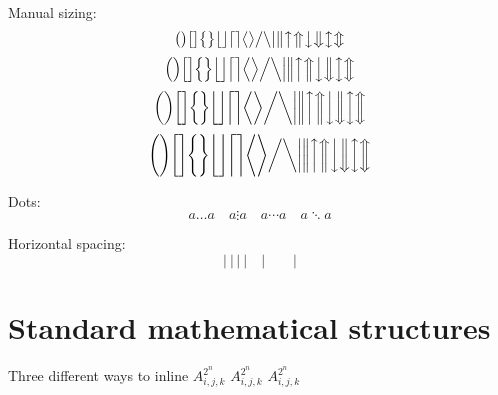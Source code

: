 Manual sizing:
\begin{dmath}[compact,spread={1.250000\baselineskip}] \big( \big) \big[ \big] \big\{ \big\} \big\lfloor \big\rfloor \big\lceil \big\rceil \big\langle \big\rangle  \big/ \big\backslash \big| \big\| \big\uparrow \big\Uparrow \big\downarrow \big\Downarrow \big\updownarrow \big\Updownarrow \end{dmath}
\begin{dmath}[compact,spread={1.250000\baselineskip}] \Big( \Big) \Big[ \Big] \Big\{ \Big\} \Big\lfloor \Big\rfloor \Big\lceil \Big\rceil \Big\langle \Big\rangle  \Big/ \Big\backslash \Big| \Big\| \Big\uparrow \Big\Uparrow \Big\downarrow \Big\Downarrow \Big\updownarrow \Big\Updownarrow \end{dmath}
\begin{dmath}[compact,spread={1.250000\baselineskip}] \bigg( \bigg) \bigg[ \bigg] \bigg\{ \bigg\} \bigg\lfloor \bigg\rfloor \bigg\lceil \bigg\rceil \bigg\langle \bigg\rangle  \bigg/ \bigg\backslash \bigg| \bigg\| \bigg\uparrow \bigg\Uparrow \bigg\downarrow \bigg\Downarrow \bigg\updownarrow \bigg\Updownarrow \end{dmath}
\begin{dmath}[compact,spread={1.250000\baselineskip}] \Bigg( \Bigg) \Bigg[ \Bigg] \Bigg\{ \Bigg\} \Bigg\lfloor \Bigg\rfloor \Bigg\lceil \Bigg\rceil \Bigg\langle \Bigg\rangle  \bigg/ \bigg\backslash \bigg| \bigg\| \bigg\uparrow \bigg\Uparrow \bigg\downarrow \bigg\Downarrow \bigg\updownarrow \bigg\Updownarrow \end{dmath}

Dots:
\begin{dmath}[compact,spread={1.250000\baselineskip}] a \ldots a \quad a \vdots a \quad  a \cdots a \quad  a \ddots a \end{dmath}

Horizontal spacing:
\begin{dmath}[compact,spread={1.250000\baselineskip}] |~|\,|\:|\quad | \qquad | \end{dmath}%

\section{Standard mathematical structures}

Three different ways to inline \begin{math}A_{i,j,k}^{2^n}\end{math} \(A_{i,j,k}^{2^n}\) \(A_{i,j,k}^{2^n}\)

